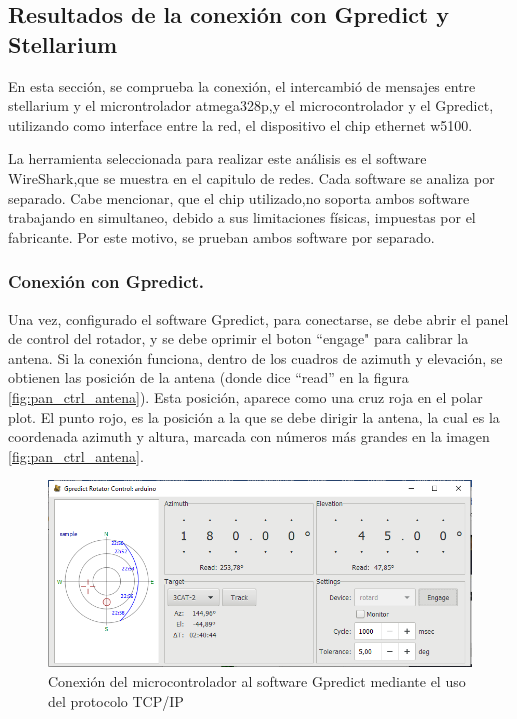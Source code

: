 \subsection{Resultados de la conexión con Gpredict y Stellarium} 

En esta sección, se comprueba la conexión, el intercambió de mensajes entre stellarium y el microntrolador atmega328p,y el microcontrolador y el Gpredict, utilizando como interface entre la red, el dispositivo el chip ethernet w5100. 

La herramienta seleccionada para realizar este análisis es el software WireShark,que se muestra en el capitulo de redes. Cada software se analiza por separado. Cabe mencionar, que el chip utilizado,no soporta ambos software trabajando en simultaneo, debido a sus limitaciones físicas, impuestas por el fabricante. Por este motivo, se prueban ambos software por separado. 

\subsubsection{Conexión con Gpredict.} 

Una vez, configurado el software Gpredict, para conectarse, se debe abrir el panel de control del rotador, y se debe oprimir el boton ``engage" para calibrar la antena. Si la conexión funciona, dentro de los cuadros de azimuth y elevación, se obtienen las posición de la antena (donde dice ``read'' en la figura \ref{fig:pan_ctrl_antena}). Esta posición, aparece como una cruz roja en el polar plot. El punto rojo, es la posición a la que se debe dirigir la antena, la cual es la coordenada azimuth y altura, marcada con números más grandes en la imagen \ref{fig:pan_ctrl_antena}. 


\begin{figure}[ht]
	\includegraphics[scale=0.7]{gpred_rotador} 
	\caption{Conexión del microcontrolador al software Gpredict mediante el uso del protocolo TCP/IP} 
	\label{fig:prueba_gpredict_1} 
\end{figure}

